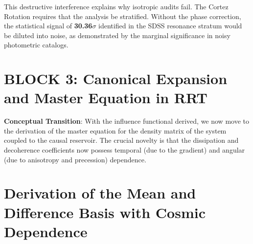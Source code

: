 \documentclass[10pt, a4paper]{article}
\begin{document}
This destructive interference explains why isotropic audits fail. The Cortez Rotation requires that the analysis be stratified. Without the phase correction, the statistical signal of \textbf{30.36$\sigma$} identified in the SDSS resonance stratum would be diluted into noise, as demonstrated by the marginal significance in noisy photometric catalogs.


\section*{BLOCK 3: Canonical Expansion and Master Equation in RRT}

\textbf{Conceptual Transition}: With the influence functional derived, we now move to the derivation of the master equation for the density matrix of the system coupled to the causal reservoir. The crucial novelty is that the dissipation and decoherence coefficients now possess temporal (due to the gradient) and angular (due to anisotropy and precession) dependence.

\section{Derivation of the Mean and Difference Basis with Cosmic Dependence}
\end{document}
